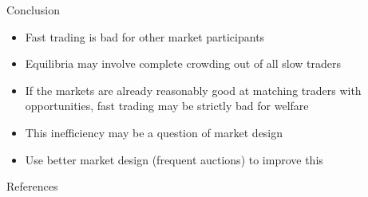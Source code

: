 \documentclass[english,10pt
,aspectratio=169
]{beamer}
\begin{document}
\begin{frame}{Conclusion}
	\begin{itemize}
		\item Fast trading is bad for other market participants
		\item Equilibria may involve complete crowding out of all slow traders
		\item If the markets are already reasonably good at matching traders with opportunities, fast trading may be strictly bad for welfare
		\item This inefficiency may be a question of market design
		\item Use better market design (frequent auctions) to improve this
	\end{itemize}
\end{frame}

\appendix
\begin{frame}[allowframebreaks]{References}
	
	
\end{frame}
\end{document}
